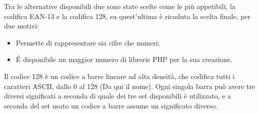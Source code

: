Tra le alternative disponibili due sono state scelte come le più appetibili, la codifica EAN-13 e la codifica 128, su quest'ultima è ricaduta la scelta finale, per due motivi:
\begin{itemize}
\item Permette di rappresentare sia cifre che numeri;
\item \'E disponibile un maggior numero di librerie PHP per la sua creazione.
\end{itemize}

Il codice 128 è un codice a barre lineare ad alta densità, che codifica tutti i caratteri ASCII, dallo 0 al 128 (Da qui il nome).
Ogni singola barra può avere tre diversi significati a seconda di quale dei tre set disponibili è utilizzato, e a seconda del set usato un codice a barre assume un significato diverso.